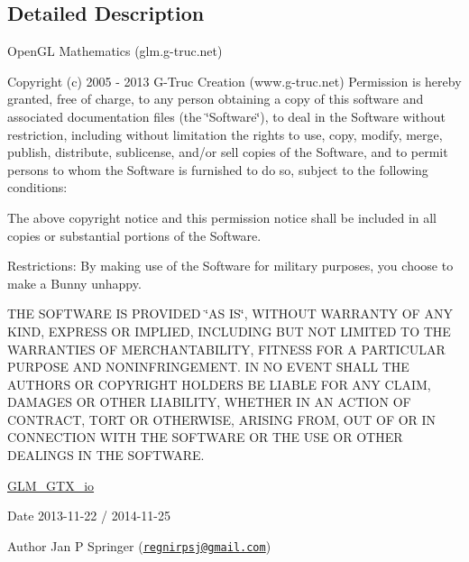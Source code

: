 \subsection{Detailed Description}
Open\-G\-L Mathematics (glm.\-g-\/truc.\-net)

Copyright (c) 2005 -\/ 2013 G-\/\-Truc Creation (www.\-g-\/truc.\-net) Permission is hereby granted, free of charge, to any person obtaining a copy of this software and associated documentation files (the \char`\"{}\-Software\char`\"{}), to deal in the Software without restriction, including without limitation the rights to use, copy, modify, merge, publish, distribute, sublicense, and/or sell copies of the Software, and to permit persons to whom the Software is furnished to do so, subject to the following conditions\-:

The above copyright notice and this permission notice shall be included in all copies or substantial portions of the Software.

Restrictions\-: By making use of the Software for military purposes, you choose to make a Bunny unhappy.

T\-H\-E S\-O\-F\-T\-W\-A\-R\-E I\-S P\-R\-O\-V\-I\-D\-E\-D \char`\"{}\-A\-S I\-S\char`\"{}, W\-I\-T\-H\-O\-U\-T W\-A\-R\-R\-A\-N\-T\-Y O\-F A\-N\-Y K\-I\-N\-D, E\-X\-P\-R\-E\-S\-S O\-R I\-M\-P\-L\-I\-E\-D, I\-N\-C\-L\-U\-D\-I\-N\-G B\-U\-T N\-O\-T L\-I\-M\-I\-T\-E\-D T\-O T\-H\-E W\-A\-R\-R\-A\-N\-T\-I\-E\-S O\-F M\-E\-R\-C\-H\-A\-N\-T\-A\-B\-I\-L\-I\-T\-Y, F\-I\-T\-N\-E\-S\-S F\-O\-R A P\-A\-R\-T\-I\-C\-U\-L\-A\-R P\-U\-R\-P\-O\-S\-E A\-N\-D N\-O\-N\-I\-N\-F\-R\-I\-N\-G\-E\-M\-E\-N\-T. I\-N N\-O E\-V\-E\-N\-T S\-H\-A\-L\-L T\-H\-E A\-U\-T\-H\-O\-R\-S O\-R C\-O\-P\-Y\-R\-I\-G\-H\-T H\-O\-L\-D\-E\-R\-S B\-E L\-I\-A\-B\-L\-E F\-O\-R A\-N\-Y C\-L\-A\-I\-M, D\-A\-M\-A\-G\-E\-S O\-R O\-T\-H\-E\-R L\-I\-A\-B\-I\-L\-I\-T\-Y, W\-H\-E\-T\-H\-E\-R I\-N A\-N A\-C\-T\-I\-O\-N O\-F C\-O\-N\-T\-R\-A\-C\-T, T\-O\-R\-T O\-R O\-T\-H\-E\-R\-W\-I\-S\-E, A\-R\-I\-S\-I\-N\-G F\-R\-O\-M, O\-U\-T O\-F O\-R I\-N C\-O\-N\-N\-E\-C\-T\-I\-O\-N W\-I\-T\-H T\-H\-E S\-O\-F\-T\-W\-A\-R\-E O\-R T\-H\-E U\-S\-E O\-R O\-T\-H\-E\-R D\-E\-A\-L\-I\-N\-G\-S I\-N T\-H\-E S\-O\-F\-T\-W\-A\-R\-E.

\hyperlink{group__gtx__io}{G\-L\-M\-\_\-\-G\-T\-X\-\_\-io}

\begin{DoxyDate}{Date}
2013-\/11-\/22 / 2014-\/11-\/25 
\end{DoxyDate}
\begin{DoxyAuthor}{Author}
Jan P Springer (\href{mailto:regnirpsj@gmail.com}{\tt regnirpsj@gmail.\-com}) 
\end{DoxyAuthor}
